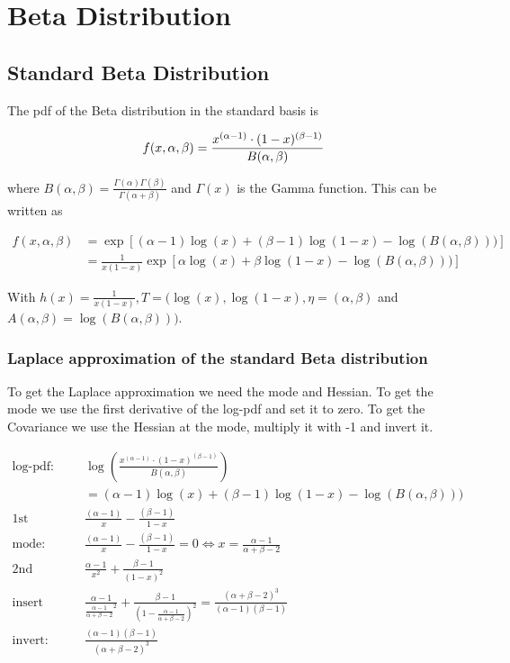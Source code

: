 \section{Beta Distribution}

\subsection{Standard Beta Distribution}

The pdf of the Beta distribution in the standard basis is

\begin{equation}
	f(x, \alpha, \beta) = \frac{x^{(\alpha - 1)} \cdot (1-x)^{(\beta-1)}}{B(\alpha, \beta)} \\
\end{equation}

where $B(\alpha, \beta) = \frac{\Gamma(\alpha)\Gamma(\beta)}{\Gamma(\alpha + \beta)}$ and $\Gamma(x)$ is the Gamma function. This can be written as 

\begin{align}
	f(x, \alpha, \beta) &=  \exp\left[(\alpha-1) \log(x) + (\beta-1)\log(1-x) - \log(B(\alpha,\beta)))\right]\\
	&= \frac{1}{x(1-x)}\exp\left[\alpha\log(x) + \beta\log(1-x) - \log(B(\alpha,\beta)))\right]
\end{align}

With $h(x) = \frac{1}{x(1-x)}, T=(\log(x), \log(1-x), \eta = (\alpha, \beta)$ and $A(\alpha, \beta) = \log(B(\alpha,\beta)))$. 


\subsubsection{Laplace approximation of the standard Beta distribution}

To get the Laplace approximation we need the mode and Hessian. To get the mode we use the first derivative of the log-pdf and set it to zero. To get the Covariance we use the Hessian at the mode, multiply it with -1 and invert it. 

\begin{align*}
\text{log-pdf: } &\log\left( \frac{x^{(\alpha - 1)} \cdot (1-x)^{(\beta-1)}}{B(\alpha, \beta)} \right) \\
&= (\alpha-1) \log(x) + (\beta-1)\log(1-x) - \log(B(\alpha,\beta)))\\
\text{1st derivative: }& \frac{(\alpha-1)}{x} - \frac{(\beta-1)}{1-x}  \\
\text{mode: }& \frac{(\alpha-1)}{x} - \frac{(\beta-1)}{1-x}  = 0 \Leftrightarrow x = \frac{\alpha-1}{\alpha + \beta - 2} \\
\text{2nd derivative: }& \frac{\alpha -1}{x^2} + \frac{\beta - 1}{(1 - x)^2} \\
\text{insert mode: }& \frac{\alpha -1}{\frac{\alpha-1}{\alpha + \beta - 2}^2} + \frac{\beta - 1}{(1 - \frac{\alpha-1}{\alpha + \beta - 2})^2} = \frac{(\alpha + \beta - 2)^3}{(\alpha-1)(\beta-1)}\\
\text{invert: }& \frac{(\alpha -1)(\beta-1)}{(\alpha + \beta - 2)^3}
\end{align*}


